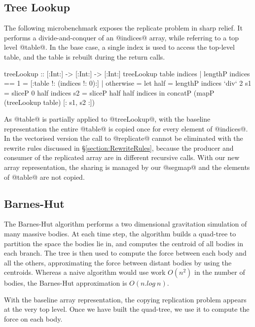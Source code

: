\subsection{Tree Lookup}
\label{section:TreeLookup}
The following microbenchmark exposes the replicate problem in sharp relief. It performs a divide-and-conquer of an @indices@ array, while referring to a top level @table@. In the base case, a single index is used to access the top-level table, and the table is rebuilt during the return calls. 
%
\begin{small}
\begin{code}
 treeLookup :: [:Int:] -> [:Int:] -> [:Int:]
 treeLookup table indices
   | lengthP indices == 1 = [:table !: (indices !: 0):]
   | otherwise
   = let half = lengthP indices `div` 2
         s1   = sliceP 0    half indices
         s2   = sliceP half half indices           
     in concatP (mapP (treeLookup table) [: s1, s2 :])
\end{code}
\end{small}
%
As @table@ is partially applied to @treeLookup@, with the baseline representation the entire @table@ is copied once for every element of @indices@. In the vectorised version the call to @replicate@ cannot be eliminated with the rewrite rules discussed in \S\ref{section:RewriteRules}, because the producer and consumer of the replicated array are in different recursive calls. With our new array representation, the sharing is managed by our @segmap@ and the elements of @table@ are not copied.


\subsection{Barnes-Hut}
The Barnes-Hut algorithm performs a two dimensional gravitation simulation of many massive bodies. At each time step, the algorithm builds a quad-tree to partition the space the bodies lie in, and computes the centroid of all bodies in each branch. The tree is then used to compute the force between each body and all the others, approximating the force between distant bodies by using the centroids. Whereas a naive algorithm would use work $O(n^2)$ in the number of bodies, the Barnes-Hut approximation is $O(n . log~ n)$.

With the baseline array representation, the copying replication problem appears at the very top level. Once we have built the quad-tree, we use it to compute the force on each body. \eject

